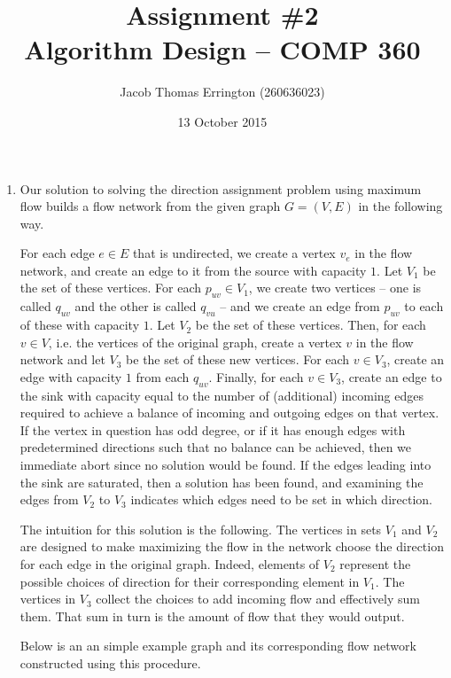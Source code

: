 \documentclass[letterpaper,11pt]{article}
\author{Jacob Thomas Errington (260636023)}
\title{Assignment \#2 \\ Algorithm Design -- COMP 360}
\date{13 October 2015}
\begin{document}
\maketitle

\begin{enumerate}

    \item Our solution to solving the direction assignment problem using
        maximum flow builds a flow network from the given graph $G = (V, E)$ in
        the following way.

        For each edge $e \in E$ that is undirected, we create a vertex $v_e$
        in the flow network, and create an edge to it from the source with
        capacity $1$. Let $V_1$ be the set of these vertices. For each
        $p_{uv} \in V_1$, we create two vertices -- one is called $q_{uv}$ and
        the other is called $q_{vu}$ -- and we create an edge from $p_{uv}$ to
        each of these with capacity $1$. Let $V_2$ be the set of these
        vertices. Then, for each $v \in V$, i.e. the vertices of the original
        graph, create a vertex $v$ in the flow network and let $V_3$ be the set
        of these new vertices. For each $v \in V_3$, create an edge with
        capacity $1$ from each $q_{uv}$. Finally, for each $v \in V_3$, create
        an edge to the sink with capacity equal to the number of (additional)
        incoming edges required to achieve a balance of incoming and outgoing
        edges on that vertex. If the vertex in question has odd degree, or if
        it has enough edges with predetermined directions such that no balance
        can be achieved, then we immediate abort since no solution would be
        found. If the edges leading into the sink are saturated, then a
        solution has been found, and examining the edges from $V_2$ to $V_3$
        indicates which edges need to be set in which direction.

        The intuition for this solution is the following. The vertices in sets
        $V_1$ and $V_2$ are designed to make maximizing the flow in the network
        choose the direction for each edge in the original graph. Indeed,
        elements of $V_2$ represent the possible choices of direction for their
        corresponding element in $V_1$. The vertices in $V_3$ collect the
        choices to add incoming flow and effectively sum them. That sum in turn
        is the amount of flow that they would output.

        Below is an an simple example graph and its corresponding flow network
        constructed using this procedure.


\end{enumerate}
\end{document}
